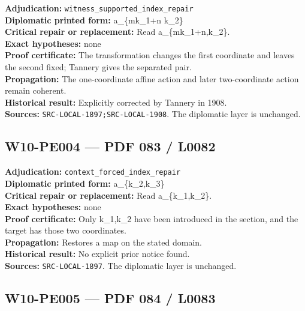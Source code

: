 \documentclass[
  10pt,
  a4paper,
]{scrreprt}
\begin{document}
\textbf{Adjudication:} \texttt{witness\_supported\_index\_repair}\\
\textbf{Diplomatic printed form:} a\_\{mk\_1+n k\_2\}\\
\textbf{Critical repair or replacement:} Read a\_\{mk\_1+n,k\_2\}.\\
\textbf{Exact hypotheses:} none\\
\textbf{Proof certificate:} The transformation changes the first
coordinate and leaves the second fixed; Tannery gives the separated
pair.\\
\textbf{Propagation:} The one-coordinate affine action and later
two-coordinate action remain coherent.\\
\textbf{Historical result:} Explicitly corrected by Tannery in 1908.\\
\textbf{Sources:} \texttt{SRC-LOCAL-1897;SRC-LOCAL-1908}. The diplomatic
layer is unchanged.

\subsection{W10-PE004 --- PDF 083 /
L0082}\label{w10-pe004-pdf-083-l0082}

\textbf{Adjudication:} \texttt{context\_forced\_index\_repair}\\
\textbf{Diplomatic printed form:} a\_\{k\_2,k\_3\}\\
\textbf{Critical repair or replacement:} Read a\_\{k\_1,k\_2\}.\\
\textbf{Exact hypotheses:} none\\
\textbf{Proof certificate:} Only k\_1,k\_2 have been introduced in the
section, and the target has those two coordinates.\\
\textbf{Propagation:} Restores a map on the stated domain.\\
\textbf{Historical result:} No explicit prior notice found.\\
\textbf{Sources:} \texttt{SRC-LOCAL-1897}. The diplomatic layer is
unchanged.

\subsection{W10-PE005 --- PDF 084 /
L0083}\label{w10-pe005-pdf-084-l0083}
\end{document}
